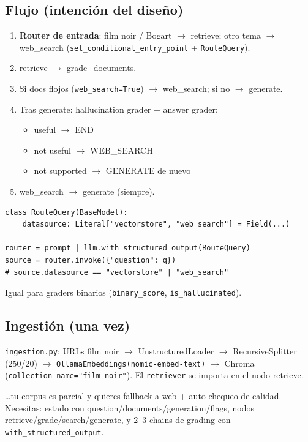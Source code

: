 \documentclass[11pt,a4paper]{article}
\begin{document}
\subsection{Flujo (intención del diseño)}
\begin{enumerate}[leftmargin=*,itemsep=1pt]
  \item \textbf{Router de entrada}: film noir / Bogart $\to$ retrieve; otro tema $\to$ web\_search
        (\texttt{set\_conditional\_entry\_point} + \texttt{RouteQuery}).
  \item retrieve $\to$ grade\_documents.
  \item Si docs flojos (\texttt{web\_search=True}) $\to$ web\_search; si no $\to$ generate.
  \item Tras generate: hallucination grader + answer grader:
        \begin{itemize}[leftmargin=*,itemsep=0pt]
          \item useful $\to$ END
          \item not useful $\to$ WEB\_SEARCH
          \item not supported $\to$ GENERATE de nuevo
        \end{itemize}
  \item web\_search $\to$ generate (siempre).
\end{enumerate}

\begin{howto}[title=Structured output para routers/graders]
\begin{lstlisting}
class RouteQuery(BaseModel):
    datasource: Literal["vectorstore", "web_search"] = Field(...)

router = prompt | llm.with_structured_output(RouteQuery)
source = router.invoke({"question": q})
# source.datasource == "vectorstore" | "web_search"
\end{lstlisting}
Igual para graders binarios (\texttt{binary\_score}, \texttt{is\_hallucinated}).
\end{howto}

\subsection{Ingestión (una vez)}
\texttt{ingestion.py}: URLs film noir $\to$ UnstructuredLoader $\to$ RecursiveSplitter (250/20)
$\to$ \texttt{OllamaEmbeddings(nomic-embed-text)} $\to$ Chroma (\texttt{collection\_name="film-noir"}).
El \texttt{retriever} se importa en el nodo retrieve.

\begin{howto}[title=Reutiliza Agentic RAG cuando\ldots]
\ldots tu corpus es parcial y quieres fallback a web + auto-chequeo de calidad.
Necesitas: estado con question/documents/generation/flags, nodos retrieve/grade/search/generate,
y 2--3 chains de grading con \texttt{with\_structured\_output}.
\end{howto}
\end{document}
